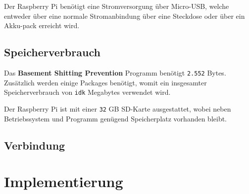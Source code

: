 Der Raspberry Pi benötigt eine Stromversorgung über Micro-USB, welche entweder über eine normale Stromanbindung über eine Steckdose oder über ein Akku-pack erreicht wird.

\subsection{Speicherverbrauch}

Das \textbf{Basement Shitting Prevention} Programm benötigt \texttt{2.552} Bytes. Zusätzlich werden einige Packages benötigt, womit ein insgesamter Speicherverbrauch von \texttt{idk} Megabytes verwendet wird.

Der Raspberry Pi ist mit einer \texttt{32} GB SD-Karte ausgestattet, wobei neben Betriebssystem und Programm genügend Speicherplatz vorhanden bleibt.

\subsection{Verbindung}




\clearpage
\section{Implementierung}
